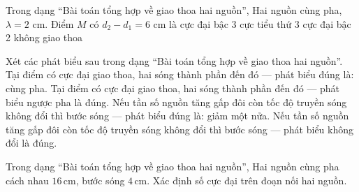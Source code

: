 \begin{ex}
Trong dạng “Bài toán tổng hợp về giao thoa hai nguồn”, Hai nguồn cùng pha, $\lambda=2$ cm. Điểm $M$ có $d_2-d_1=6$ cm là
\choice
{\True cực đại bậc 3}
{cực tiểu thứ 3}
{cực đại bậc 2}
{không giao thoa}
\end{ex}

\begin{ex}
Xét các phát biểu sau trong dạng “Bài toán tổng hợp về giao thoa hai nguồn”.
\choiceTF
{\True Tại điểm có cực đại giao thoa, hai sóng thành phần đến đó — phát biểu đúng là: cùng pha.}
{Tại điểm có cực đại giao thoa, hai sóng thành phần đến đó — phát biểu ngược pha là đúng.}
{\True Nếu tần số nguồn tăng gấp đôi còn tốc độ truyền sóng không đổi thì bước sóng — phát biểu đúng là: giảm một nửa.}
{Nếu tần số nguồn tăng gấp đôi còn tốc độ truyền sóng không đổi thì bước sóng — phát biểu không đổi là đúng.}
\end{ex}

\begin{ex}
Trong dạng “Bài toán tổng hợp về giao thoa hai nguồn”, Hai nguồn cùng pha cách nhau $16\,\text{cm}$, bước sóng $4\,\text{cm}$. Xác định số cực đại trên đoạn nối hai nguồn.
\choiceTF

\end{ex}

